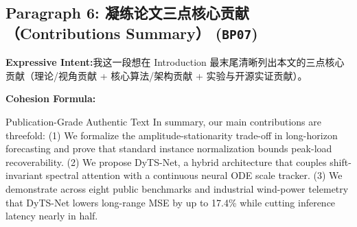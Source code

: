 \subsection*{Paragraph 6: 凝练论文三点核心贡献（Contributions Summary） (\texttt{BP07})}
\noindent\textbf{Expressive Intent:}\enspace 我这一段想在 Introduction 最末尾清晰列出本文的三点核心贡献（理论/视角贡献 + 核心算法/架构贡献 + 实验与开源实证贡献）。\par
\noindent\textbf{Cohesion Formula:}\par\vspace{4pt}
\begin{ExampleBox}{Publication-Grade Authentic Text}
In summary, our main contributions are threefold: (1) We formalize the amplitude-stationarity trade-off in long-horizon forecasting and prove that standard instance normalization bounds peak-load recoverability. (2) We propose DyTS-Net, a hybrid architecture that couples shift-invariant spectral attention with a continuous neural ODE scale tracker. (3) We demonstrate across eight public benchmarks and industrial wind-power telemetry that DyTS-Net lowers long-range MSE by up to 17.4\% while cutting inference latency nearly in half.
\end{ExampleBox}
